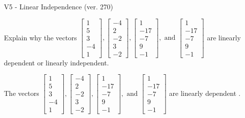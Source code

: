\begin{exercise}
  \begin{exerciseTitle}V5 - Linear Independence (ver. 270)\end{exerciseTitle}
  \begin{exerciseStatement}
    Explain why the vectors \(\left[\begin{array}{r}
1 \\
5 \\
3 \\
-4 \\
1
\end{array}\right] , \left[\begin{array}{r}
-4 \\
2 \\
-2 \\
3 \\
-2
\end{array}\right] , \left[\begin{array}{r}
1 \\
-17 \\
-7 \\
9 \\
-1
\end{array}\right] , \text{ and } \left[\begin{array}{r}
1 \\
-17 \\
-7 \\
9 \\
-1
\end{array}\right]\) are linearly dependent or linearly independent.	


  \end{exerciseStatement}
  \begin{exerciseAnswer}
   The vectors \(\left[\begin{array}{r}
1 \\
5 \\
3 \\
-4 \\
1
\end{array}\right] , \left[\begin{array}{r}
-4 \\
2 \\
-2 \\
3 \\
-2
\end{array}\right] , \left[\begin{array}{r}
1 \\
-17 \\
-7 \\
9 \\
-1
\end{array}\right] , \text{ and } \left[\begin{array}{r}
1 \\
-17 \\
-7 \\
9 \\
-1
\end{array}\right]\) are 
  	 linearly dependent  .
  


  \end{exerciseAnswer}
\end{exercise}